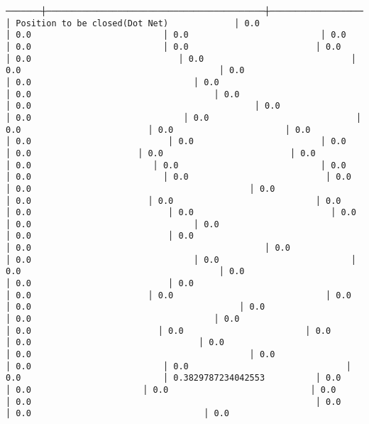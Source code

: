 \documentclass[11pt]{article}
\begin{document}
\begin{Verbatim}[commandchars=\\\{\}]
───────┼───────────────────────────────────────────┼───────────────────────────────────────────┼────────────────────────────────────┼────────────────────────┼───────────────────────────────────────┼──────────────────────────────────────┼────────────────────────────────────┼────────────────────────────────────────┼────────────────────────────────┼──────────────────────────┼─────────────────────────────┤
│ Position to be closed(Dot Net)             │ 0.0                                      │ 0.0                          │ 0.0                          │ 0.0                          │ 0.0                          │ 0.0                         │ 0.0                         │ 0.0                             │ 0.0                             │ 0.0                                       │ 0.0                                  │ 0.0                                │ 0.0                                         │ 0.0                                    │ 0.0                                    │ 0.0                                            │ 0.0                             │ 0.0                              │ 0.0                             │ 0.0                         │ 0.0                      │ 0.0                                │ 0.0                           │ 0.0                         │ 0.0                      │ 0.0                     │ 0.0                         │ 0.0                                  │ 0.0                        │ 0.0                            │ 0.0                           │ 0.0                          │ 0.0                           │ 0.0                                            │ 0.0                                           │ 0.0                      │ 0.0                       │ 0.0                            │ 0.0                                │ 0.0                           │ 0.0                           │ 0.0                          │ 0.0                                │ 0.0                            │ 0.0                           │ 0.0                                         │ 0.0                                              │ 0.0                           │ 0.0                                │ 0.0                          │ 0.0                                       │ 0.0                          │ 0.0                           │ 0.0                                     │ 0.0                       │ 0.0                              │ 0.0                                     │ 0.0                                         │ 0.0                                         │ 0.0                                    │ 0.0                                │ 0.0                         │ 0.0                        │ 0.0                              │ 0.0                                 │ 0.0                            │ 0.0                                           │ 0.0                            │ 0.0                          │ 0.0                               │ 0.0                            │ 0.3829787234042553          │ 0.0                     │ 0.0                      │ 0.0                            │ 0.0                                   │ 0.0                                                        │ 0.0                                       │ 0.0                                  │ 0.0                          
\end{Verbatim}
\end{document}
